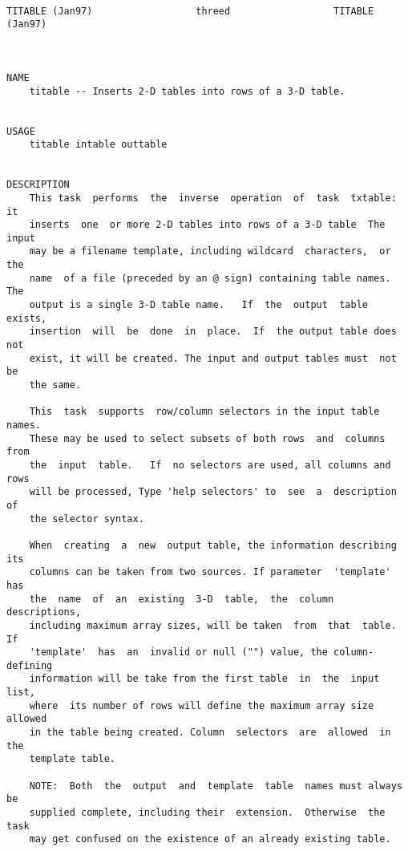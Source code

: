 \topmargin	-30mm
\textheight	250mm
\oddsidemargin   -5mm
\evensidemargin  -5mm
\textwidth      170mm



\tableofcontents

\newpage

\begin{verbatim}

TITABLE (Jan97)                  threed                  TITABLE (Jan97)



NAME
    titable -- Inserts 2-D tables into rows of a 3-D table.
    
    
USAGE
    titable intable outtable
    
    
DESCRIPTION
    This task  performs  the  inverse  operation  of  task  txtable:  it
    inserts  one  or more 2-D tables into rows of a 3-D table  The input
    may be a filename template, including wildcard  characters,  or  the
    name  of a file (preceded by an @ sign) containing table names.  The
    output is a single 3-D table name.   If  the  output  table  exists,
    insertion  will  be  done  in  place.  If  the output table does not
    exist, it will be created. The input and output tables must  not  be
    the same.
    
    This  task  supports  row/column selectors in the input table names.
    These may be used to select subsets of both rows  and  columns  from
    the  input  table.   If  no selectors are used, all columns and rows
    will be processed, Type 'help selectors' to  see  a  description  of
    the selector syntax.
    
    When  creating  a  new  output table, the information describing its
    columns can be taken from two sources. If parameter  'template'  has
    the  name  of  an  existing  3-D  table,  the  column  descriptions, 
    including maximum array sizes, will be taken  from  that  table.  If
    'template'  has  an  invalid or null ("") value, the column-defining
    information will be take from the first table  in  the  input  list,
    where  its number of rows will define the maximum array size allowed
    in the table being created. Column  selectors  are  allowed  in  the
    template table.
    
    NOTE:  Both  the  output  and  template  table  names must always be
    supplied complete, including their  extension.  Otherwise  the  task
    may get confused on the existence of an already existing table.
    

\end{verbatim}
